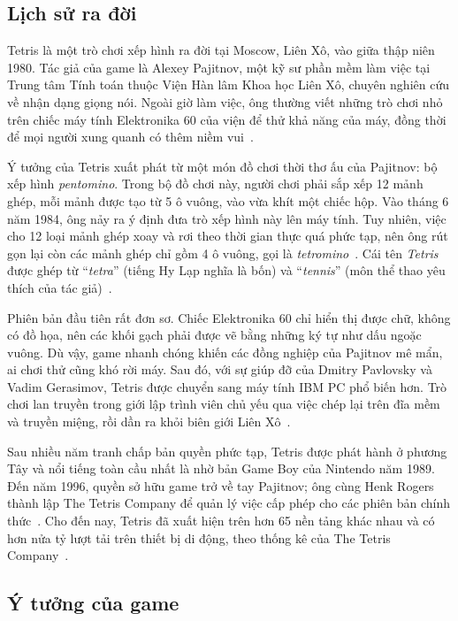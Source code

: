 \documentclass[12pt,a4paper,oneside]{report}
\begin{document}
\subsection{Lịch sử ra đời}

Tetris là một trò chơi xếp hình ra đời tại Moscow, Liên Xô, vào giữa thập niên 1980. Tác giả của game là Alexey Pajitnov, một kỹ sư phần mềm làm việc tại Trung tâm Tính toán thuộc Viện Hàn lâm Khoa học Liên Xô, chuyên nghiên cứu về nhận dạng giọng nói. Ngoài giờ làm việc, ông thường viết những trò chơi nhỏ trên chiếc máy tính Elektronika 60 của viện để thử khả năng của máy, đồng thời để mọi người xung quanh có thêm niềm vui~\cite{tetris_wiki,tetris_myjoy}.

Ý tưởng của Tetris xuất phát từ một món đồ chơi thời thơ ấu của Pajitnov: bộ xếp hình \textit{pentomino}. Trong bộ đồ chơi này, người chơi phải sắp xếp 12 mảnh ghép, mỗi mảnh được tạo từ 5 ô vuông, vào vừa khít một chiếc hộp. Vào tháng 6 năm 1984, ông nảy ra ý định đưa trò xếp hình này lên máy tính. Tuy nhiên, việc cho 12 loại mảnh ghép xoay và rơi theo thời gian thực quá phức tạp, nên ông rút gọn lại còn các mảnh ghép chỉ gồm 4 ô vuông, gọi là \textit{tetromino}~\cite{guardian_tetris,tetris_wiki}. Cái tên \textit{Tetris} được ghép từ ``\textit{tetra}'' (tiếng Hy Lạp nghĩa là bốn) và ``\textit{tennis}'' (môn thể thao yêu thích của tác giả)~\cite{filfre_tetris}.

Phiên bản đầu tiên rất đơn sơ. Chiếc Elektronika 60 chỉ hiển thị được chữ, không có đồ họa, nên các khối gạch phải được vẽ bằng những ký tự như dấu ngoặc vuông. Dù vậy, game nhanh chóng khiến các đồng nghiệp của Pajitnov mê mẩn, ai chơi thử cũng khó rời máy. Sau đó, với sự giúp đỡ của Dmitry Pavlovsky và Vadim Gerasimov, Tetris được chuyển sang máy tính IBM PC phổ biến hơn. Trò chơi lan truyền trong giới lập trình viên chủ yếu qua việc chép lại trên đĩa mềm và truyền miệng, rồi dần ra khỏi biên giới Liên Xô~\cite{denofgeek_tetris,tetris_myjoy}.

Sau nhiều năm tranh chấp bản quyền phức tạp, Tetris được phát hành ở phương Tây và nổi tiếng toàn cầu nhất là nhờ bản Game Boy của Nintendo năm 1989. Đến năm 1996, quyền sở hữu game trở về tay Pajitnov; ông cùng Henk Rogers thành lập The Tetris Company để quản lý việc cấp phép cho các phiên bản chính thức~\cite{tetris_wiki,tetris_myjoy}. Cho đến nay, Tetris đã xuất hiện trên hơn 65 nền tảng khác nhau và có hơn nửa tỷ lượt tải trên thiết bị di động, theo thống kê của The Tetris Company~\cite{tetris_myjoy}.

\subsection{Ý tưởng của game}
\end{document}
